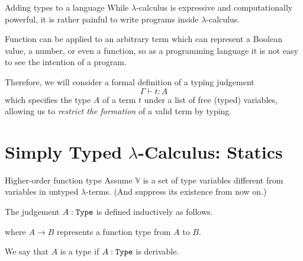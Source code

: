 \begin{frame}{Adding types to a language}
  While $\lambda$-calculus is expressive and computationally powerful, it is rather painful to write programs inside $\lambda$-calculus.

  Function can be applied to an arbitrary term which can represent a Boolean value, a number, or even a function, so as a programming language it is not easy to see the \alert{intention} of a program.

  Therefore, we will consider a formal definition of a \alert{typing judgement}
  \[
    \Gamma \vdash t : A
  \]
  which specifies the type $A$ of a term $t$ under a list of free (typed) variables, allowing us to \emph{restrict the formation} of a valid term by typing.
\end{frame}

\section{Simply Typed \texorpdfstring{$\lambda$}{λ}-Calculus: Statics}

%



\begin{frame}{Higher-order function type}
Assume $\mathbb{V}$ is a set of type variables different from variables in untyped $\lambda$-terms. 
(And suppress its existence from now on.)

\begin{definition}
  The judgement $A : \type$ is defined inductively as follows.
  \begin{multicols}{2}
    \begin{prooftree}
    \end{prooftree}
    \begin{prooftree}
    \end{prooftree}
  \end{multicols}
  where $A \to B$ represents a function type from $A$ to $B$.
\end{definition}
We say that $A$ is a type if $A : \type$ is derivable.

\end{frame}

